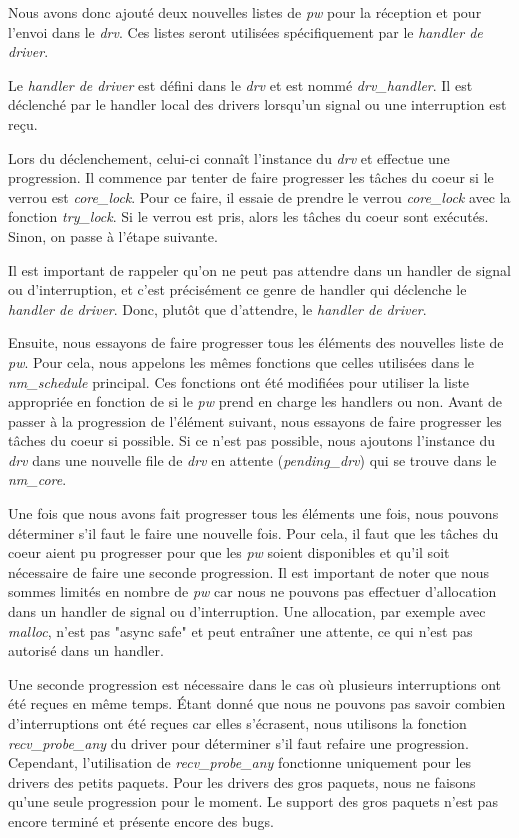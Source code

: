 Nous avons donc ajouté deux nouvelles listes de \emph{pw} pour la réception et pour l'envoi dans le \emph{drv}.
Ces listes seront utilisées spécifiquement par le \emph{handler de driver}.

Le \emph{handler de driver} est défini dans le \emph{drv} et est nommé \emph{drv_handler}.
Il est déclenché par le handler local des drivers lorsqu'un signal ou une interruption est reçu.

Lors du déclenchement, celui-ci connaît l'instance du \emph{drv} et effectue une progression.
Il commence par tenter de faire progresser les tâches du coeur si le verrou est \emph{core_lock}.
Pour ce faire, il essaie de prendre le verrou \emph{core_lock} avec la fonction \emph{try_lock}.
Si le verrou est pris, alors les tâches du coeur sont exécutés. Sinon, on passe à l'étape suivante.

Il est important de rappeler qu'on ne peut pas attendre dans un handler de signal ou d'interruption,
et c'est précisément ce genre de handler qui déclenche le \emph{handler de driver}.
Donc, plutôt que d'attendre, le \emph{handler de driver}.

Ensuite, nous essayons de faire progresser tous les éléments des nouvelles liste de \emph{pw}.
Pour cela, nous appelons les mêmes fonctions que celles utilisées dans le \emph{nm_schedule} principal.
Ces fonctions ont été modifiées pour utiliser la liste appropriée en fonction de si le \emph{pw} prend en charge les handlers ou non.
Avant de passer à la progression de l'élément suivant, nous essayons de faire progresser les tâches du coeur si possible.
Si ce n'est pas possible, nous ajoutons l'instance du \emph{drv} dans une nouvelle file de \emph{drv} en attente (\emph{pending_drv}) qui se trouve dans le \emph{nm_core}.

Une fois que nous avons fait progresser tous les éléments une fois, nous pouvons déterminer s'il faut le faire une nouvelle fois.
Pour cela, il faut que les tâches du coeur aient pu progresser pour que les \emph{pw} soient disponibles et qu'il soit nécessaire de faire une seconde progression.
Il est important de noter que nous sommes limités en nombre de \emph{pw} car nous ne pouvons pas effectuer d'allocation dans un handler de signal ou d'interruption.
Une allocation, par exemple avec \emph{malloc}, n'est pas "async safe" et peut entraîner une attente,
ce qui n'est pas autorisé dans un handler.

Une seconde progression est nécessaire dans le cas où plusieurs interruptions ont été reçues en même temps.
Étant donné que nous ne pouvons pas savoir combien d'interruptions ont été reçues car elles s'écrasent,
nous utilisons la fonction \emph{recv_probe_any} du driver pour déterminer s'il faut refaire une progression.
Cependant, l'utilisation de \emph{recv_probe_any} fonctionne uniquement pour les drivers des petits paquets.
Pour les drivers des gros paquets, nous ne faisons qu'une seule progression pour le moment.
Le support des gros paquets n'est pas encore terminé et présente encore des bugs.


